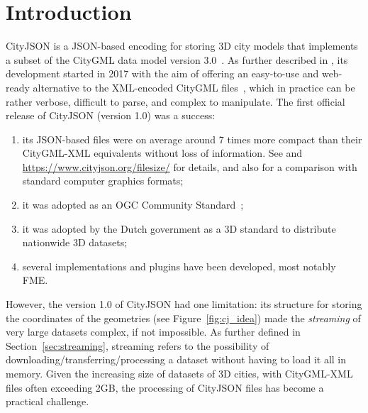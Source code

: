 \documentclass[11pt,halfparskip,parskip=half]{scrartcl}
\begin{document}




%
\section{Introduction}%
\label{sec:intro}

CityJSON is a JSON-based encoding for storing 3D city models that implements a subset of the CityGML data model version 3.0~\citep{OGC-CityGML3}.
As further described in \citet{19_ogdss_cityjson}, its development started in 2017 with the aim of offering an easy-to-use and web-ready alternative to the XML-encoded CityGML files~\citep{OGC-CityGML3-XML}, which in practice can be rather verbose, difficult to parse, and complex to manipulate.
The first official release of CityJSON (version 1.0) was a success:
\begin{enumerate}
  \item its JSON-based files were on average around 7 times more compact than their CityGML-XML equivalents without loss of information. See \citet{19_ogdss_cityjson} and \url{https://www.cityjson.org/filesize/} for details, and also \citet{Praschl23} for a comparison with standard computer graphics formats;
  \item it was adopted as an OGC Community Standard~\citep{OGC-CityJSON-v10};
  \item it was adopted by the Dutch government as a 3D standard to distribute nationwide 3D datasets;
  \item several implementations and plugins have been developed, most notably FME\@.
\end{enumerate}



%

However, the version 1.0 of CityJSON had one limitation: its structure for storing the coordinates of the geometries (see Figure~\ref{fig:cj_idea}) made the \emph{streaming} of very large datasets complex, if not impossible.
As further defined in Section~\ref{sec:streaming}, streaming refers to the possibility of downloading/transferring/processing a dataset without having to load it all in memory.
Given the increasing size of datasets of 3D cities, with CityGML-XML files often exceeding 2GB, the processing of CityJSON files has become a practical challenge.

%
\end{document}
